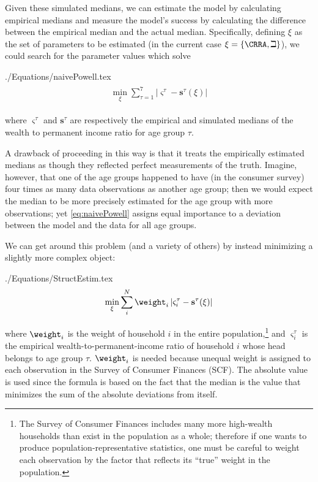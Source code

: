 \documentclass[titlepage, headings=optiontotocandhead]{\econtex}
\begin{document}
Given these simulated medians, we can estimate the model by
calculating empirical medians and measure the model's success
by calculating the difference between the empirical median and the
actual median.  Specifically, defining $\xi$ as the set of parameters
to be estimated (in the current case $\xi =\{\CRRA ,{\beth}\}$), we could search for
the parameter values which solve
\begin{verbatimwrite}{./Equations/naivePowell.tex}
  \begin{equation}\begin{gathered}\begin{aligned}
        \min_{\xi} \sum_{\tau=1}^{7} |\varsigma^{\tau} -\mathbf{s}^{\tau}(\xi)|  \label{eq:naivePowell}
      \end{aligned}\end{gathered}\end{equation}
\end{verbatimwrite}
\unskip
where $\varsigma^{\tau }$ and $\mathbf{s}^{\tau}$ are respectively the empirical and simulated medians of the wealth to permanent income ratio for age group $\tau $.

A drawback of proceeding in this way is that it treats the empirically
estimated medians as though they reflected perfect measurements of the
truth. Imagine, however, that one of the age groups happened to have
(in the consumer survey) four times as many data observations as
another age group; then we would expect the median to be more
precisely estimated for the age group with more observations; yet
\eqref{eq:naivePowell} assigns equal importance to a deviation between
the model and the data for all age groups.

We can get around this problem (and a variety of others) by instead minimizing a slightly more complex object:
\begin{verbatimwrite}{./Equations/StructEstim.tex}
  \begin{equation}
    \min_{\xi}\sum\limits_{i}^{N}\weight _{i}\left|\varsigma_{i}^{\tau }-\mathbf{s}^{\tau}(\xi )\right|\label{eq:StructEstim}
  \end{equation}
\end{verbatimwrite}
\unskip
where $\weight_{i}$ is the weight of household $i$ in the entire
population,\footnote{The Survey of Consumer Finances includes many
  more high-wealth households than exist in the population as a whole;
  therefore if one wants to produce population-representative
  statistics, one must be careful to weight each observation by the
  factor that reflects its ``true'' weight in the population.} and
$\varsigma_{i}^{\tau }$ is the empirical wealth-to-permanent-income
ratio of household $i$ whose head belongs to age group
$\tau$. $\weight _{i}$ is needed because unequal weight is assigned to
each observation in the Survey of Consumer Finances (SCF). The
absolute value is used since the formula is based on the fact that the
median is the value that minimizes the sum of the absolute deviations
from itself.
\end{document}
